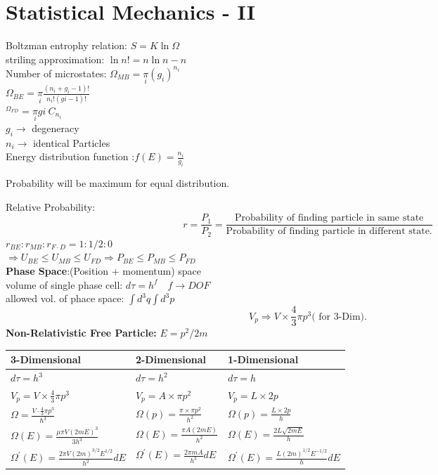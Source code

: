 \chapter{Statistical Mechanics - II}
Boltzman entrophy relation: $S=K \ln \Omega$\\
striling approximation: $\ln n !=n \ln n-n$\\
Number of microstates: 
$\Omega_{M B}=\underset{i}{\pi}\left(g_{i}\right)^{n_{i}}$\\
$\Omega_{B E}=\underset{i}{\pi}\frac{\left(n_{i}+g_{i}-1\right) !}{n_{i} !(g i-1) !}$\\
${ }^{\Omega_{F D}}=\underset{i}{\pi}{g i }\  C_{n_{i}}$\\
$g_{i} \rightarrow$ degeneracy\\
$n_{i} \rightarrow$ identical Particles\\
Energy distribution function :$f(E)=\frac{n_{i}}{g_{i}}$
\begin{note}
	Probability will be maximum for equal distribution.
\end{note}
Relative Probability: \\
$$r=\frac{P_1}{P_2}=\frac{\text{Probability of finding particle in same state}}{\text{Probability of finding particle in different state.}}$$
$r_{B E}: r_{M B}: r_{F \cdot D}=1: 1 / 2: 0$\\
$\Rightarrow U_{B E} \leqslant U_{M B} \leqslant U_{F D} \Rightarrow P_{B E} \leqslant P_{M B} \leqslant P_{F D}$ \\
\textbf{Phase Space}:(Position + momentum) space\\
volume of single phase cell: $d \tau=h^{f} \quad f \rightarrow D O F$\\
allowed vol. of phace space: $\int d^{3} q \int d^{3} p$\\
$$
V_{p} \Rightarrow V \times \frac{4}{3} \pi p^{3}\text{( for 3-Dim).}
$$
\textbf{Non-Relativistic Free Particle: }$E=p^2/2m$\\
\renewcommand*{\arraystretch}{1.8}
\begin{tabular}{|p{4cm}|p{4cm}|p{4cm}|}
	\hline
	3-Dimensional&2-Dimensional&1-Dimensional\\\hline
	$d \tau=h^{3}$&$d \tau=h^{2}$&$d \tau=h$\\\hline
	$V_{p}=V \times \frac{4}{3} \pi p^{3}$&$V_{p}=A \times \pi p^{2}$&$V_p=L\times2p$\\\hline
	$\Omega=\frac{V \cdot \frac{4}{3} \pi p^{3}}{\hbar^{3}}$&$\Omega(p)=\frac{\pi \times \pi p^{2}}{h^{2}}$&$\Omega(p)=\frac{L \times 2 p}{h}$\\\hline
	$\Omega(E)=\frac{\mu\pi V(2mE)^3}{3h^3}$&$\Omega(E)=\frac{\pi A(2mE)}{h^2}$&$\Omega(E)=\frac{2L\sqrt{2mE}}{h}$\\\hline
	$\Omega^{\prime}(E)=\frac{2 \pi V(2 m)^{3 / 2} E^{1 / 2}}{h^2}dE$&$\Omega^{\prime}(E)=\frac{2 \pi mA}{h^3}dE$&$\Omega^{\prime}(E)=\frac{L(2m)^{1/2}E^{-1/2}}{h}dE$\\\hline
\end{tabular}
